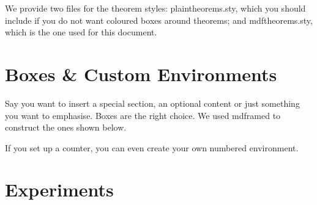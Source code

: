 We provide two files for the theorem styles: plaintheorems.sty, which 
you should include if you do not want coloured boxes around theorems; 
and mdftheorems.sty, which is the one used for this document.

\section[Boxes \& Environments]{Boxes \& Custom Environments
}

Say you want to insert a special section, an optional content or just 
something you want to emphasise. Boxes are the right choice. We used 
mdframed to construct the ones shown below.

\begin{kaobox}[frametitle=Title of the box]
\blindtext
\end{kaobox}

If you set up a counter, you can even create your own numbered 
environment.

\begin{commentbox}
	\blindtext
\end{commentbox}



\section{Experiments}

\blindtext


\blindtext

